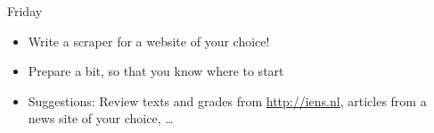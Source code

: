\documentclass{beamer}
\begin{document}
\begin{frame}{Friday}
\begin{itemize}
\item Write a scraper for a website of your choice!
\item Prepare a bit, so that you know where to start
\item Suggestions: Review texts and grades from \url{http://iens.nl}, articles from a news site of your choice, \ldots
\end{itemize}
\end{frame}


\begin{frame}[plain]{}
\end{frame}
\end{document}
